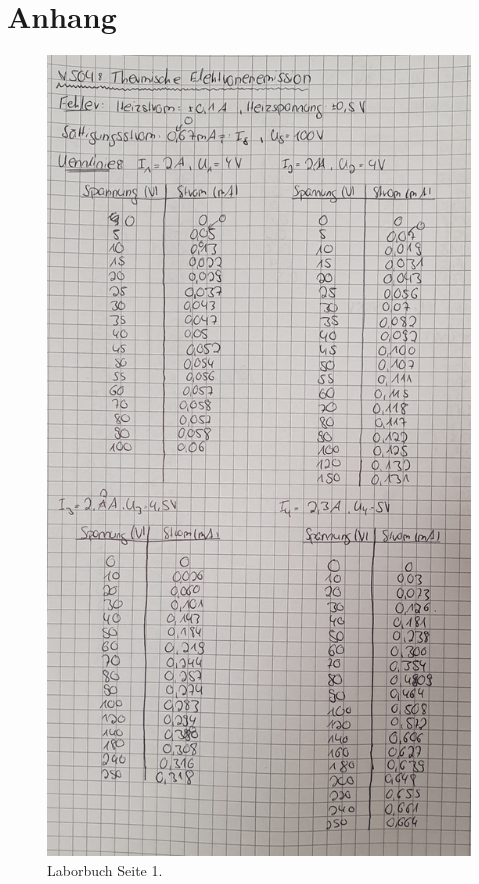 \section{Anhang}

\begin{figure}[H]
    \centering
    \includegraphics[height=0.9\textheight]{content/Laborbuch1.jpg}
    \caption{Laborbuch Seite 1.}
\end{figure}

